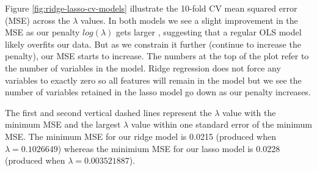 \documentclass[]{book}
\newenvironment{Shaded}{\begin{snugshade}}{\end{snugshade}}
\newcommand{\CommentTok}[1]{\textcolor[rgb]{0.56,0.35,0.01}{\textit{#1}}}
\newcommand{\FloatTok}[1]{\textcolor[rgb]{0.00,0.00,0.81}{#1}}
\newcommand{\KeywordTok}[1]{\textcolor[rgb]{0.13,0.29,0.53}{\textbf{#1}}}
\newcommand{\NormalTok}[1]{#1}
\newcommand{\OperatorTok}[1]{\textcolor[rgb]{0.81,0.36,0.00}{\textbf{#1}}}
\newcommand{\StringTok}[1]{\textcolor[rgb]{0.31,0.60,0.02}{#1}}
\theoremstyle{definition}
\theoremstyle{definition}
\theoremstyle{definition}
\theoremstyle{remark}
\begin{document}
Figure \ref{fig:ridge-lasso-cv-models} illustrate the 10-fold CV mean
squared error (MSE) across the \(\lambda\) values. In both models we see
a slight improvement in the MSE as our penalty \(log(\lambda)\) gets
larger , suggesting that a regular OLS model likely overfits our data.
But as we constrain it further (continue to increase the penalty), our
MSE starts to increase. The numbers at the top of the plot refer to the
number of variables in the model. Ridge regression does not force any
variables to exactly zero so all features will remain in the model but
we see the number of variables retained in the lasso model go down as
our penalty increases.

The first and second vertical dashed lines represent the \(\lambda\)
value with the minimum MSE and the largest \(\lambda\) value within one
standard error of the minimum MSE. The minimum MSE for our ridge model
is 0.0215 (produced when \(\lambda = 0.1026649\)) whereas the minimium
MSE for our lasso model is 0.0228 (produced when
\(\lambda = 0.003521887\)).

\begin{Shaded}
\end{Shaded}
\end{document}
